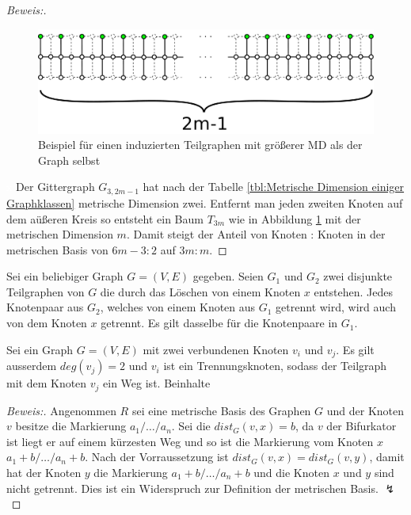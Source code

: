 \begin{proof}[Beweis:]$\;$
\begin{figure}[h!]
		\centering 		 
\includegraphics[width=420pt]{bilder/gitterzubaumlsch.pdf}
   \caption{Beispiel für einen induzierten Teilgraphen mit größerer MD als der Graph selbst}
   \label{bild:Gitterbaum2}
  	 \end{figure}
\textcolor{white}{x}\newline
Der Gittergraph $G_{3,2m-1}$ hat nach der Tabelle \ref{tbl:Metrische Dimension einiger Graphklassen} metrische Dimension zwei. Entfernt man jeden zweiten Knoten auf dem aüßeren Kreis so entsteht ein Baum $T_{3m}$ wie in Abbildung \ref{bild:Gitterbaum2} mit der metrischen Dimension $m$. Damit steigt der Anteil von Knoten : Knoten in der metrischen Basis von $6m-3:2$ auf $3m:m$.
\end{proof}
\newpage
\begin{lem}
\label{trennungsknoten}
Sei ein beliebiger Graph $G=(V,E)$ gegeben. Seien $G_1$ und $G_2$ zwei disjunkte Teilgraphen von $G$ die durch das Löschen von einem Knoten $x$ entstehen. Jedes Knotenpaar aus $G_2$, welches von einem Knoten aus $G_1$ getrennt wird, wird auch von dem Knoten $x$ getrennt. Es gilt dasselbe für die Knotenpaare in $G_1$.
\end{lem}
\begin{lem}
\label{wegtrennungsknoten}
Sei ein Graph $G=(V,E)$ mit zwei verbundenen Knoten $v_i$ und $v_j$. Es gilt ausserdem $deg(v_j)=2$ und $v_i$ ist ein Trennungsknoten, sodass der Teilgraph mit dem Knoten $v_j$ ein Weg ist. Beinhalte 
\end{lem}
\begin{proof}[Beweis:]
Angenommen $R$ sei eine metrische Basis des Graphen $G$ und der Knoten $v$ besitze die Markierung $a_1/\ldots /a_n$. Sei die $dist_G(v,x)=b$, da $v$ der Bifurkator ist liegt er auf einem kürzesten Weg und so ist die Markierung vom Knoten $x$ $a_1+b/\ldots /a_n+b$. Nach der Vorraussetzung ist $dist_G(v,x)=dist_G(v,y)$, damit hat der Knoten $y$ die Markierung $a_1+b/\ldots /a_n+b$ und die Knoten $x$ und $y$ sind nicht getrennt. Dies ist ein Widerspruch zur Definition der metrischen Basis. $\lightning$
\end{proof}

